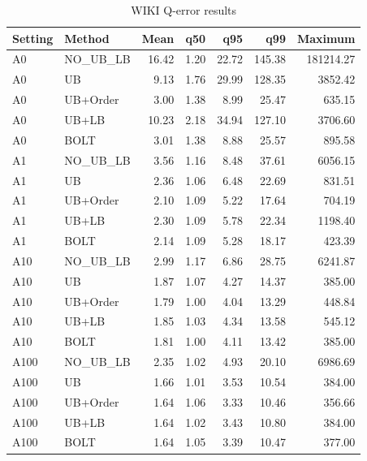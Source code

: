 \begin{table}[H]
\centering
\small
\setlength{\tabcolsep}{5pt}
\caption{WIKI Q-error results}
\label{tab:A_accuracy_WIKI}
\begin{tabular}{@{}llrrrrr@{}}
\toprule
Setting & Method & Mean & q50 & q95 & q99 & Maximum \\
\midrule
A0 & NO\_UB_LB & 16.42 & 1.20 & 22.72 & 145.38 & 181214.27 \\
A0 & UB & 9.13 & 1.76 & 29.99 & 128.35 & 3852.42 \\
A0 & UB+Order & 3.00 & 1.38 & 8.99 & 25.47 & 635.15 \\
A0 & UB+LB & 10.23 & 2.18 & 34.94 & 127.10 & 3706.60 \\
A0 & BOLT & 3.01 & 1.38 & 8.88 & 25.57 & 895.58 \\
A1 & NO\_UB_LB & 3.56 & 1.16 & 8.48 & 37.61 & 6056.15 \\
A1 & UB & 2.36 & 1.06 & 6.48 & 22.69 & 831.51 \\
A1 & UB+Order & 2.10 & 1.09 & 5.22 & 17.64 & 704.19 \\
A1 & UB+LB & 2.30 & 1.09 & 5.78 & 22.34 & 1198.40 \\
A1 & BOLT & 2.14 & 1.09 & 5.28 & 18.17 & 423.39 \\
A10 & NO\_UB_LB & 2.99 & 1.17 & 6.86 & 28.75 & 6241.87 \\
A10 & UB & 1.87 & 1.07 & 4.27 & 14.37 & 385.00 \\
A10 & UB+Order & 1.79 & 1.00 & 4.04 & 13.29 & 448.84 \\
A10 & UB+LB & 1.85 & 1.03 & 4.34 & 13.58 & 545.12 \\
A10 & BOLT & 1.81 & 1.00 & 4.11 & 13.42 & 385.00 \\
A100 & NO\_UB_LB & 2.35 & 1.02 & 4.93 & 20.10 & 6986.69 \\
A100 & UB & 1.66 & 1.01 & 3.53 & 10.54 & 384.00 \\
A100 & UB+Order & 1.64 & 1.06 & 3.33 & 10.46 & 356.66 \\
A100 & UB+LB & 1.64 & 1.02 & 3.43 & 10.80 & 384.00 \\
A100 & BOLT & 1.64 & 1.05 & 3.39 & 10.47 & 377.00 \\
\bottomrule
\end{tabular}
\end{table}
